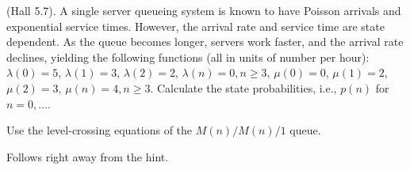 \begin{exercise}
  (Hall 5.7). A single server queueing system is known to have Poisson
  arrivals and exponential service times. However, the arrival rate
  and service time are state dependent. As the queue becomes longer,
  servers work faster, and the arrival rate declines, yielding the
  following functions (all in units of number per hour):
  $\lambda(0) = 5$, $\lambda(1)=3$, $\lambda(2)=2$,
  $\lambda(n)=0, n\geq 3$, $\mu(0) = 0$, $\mu(1)=2$, $\mu(2)=3$, $\mu(n)=4, n\geq 3$. 
Calculate the state probabilities, i.e., $p(n)$ for $n=0,\ldots$. 
\begin{hint}
Use the level-crossing equations of the $M(n)/M(n)/1$ queue.
\end{hint}
    \begin{solution}
      Follows right away from the hint.
    \end{solution}
\end{exercise}

